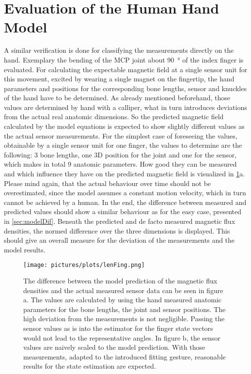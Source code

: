 \FloatBarrier
\section{Evaluation of the Human Hand Model} \label{sec:evalHand}

A similar verification is done for classifying the measurements directly on the hand. Exemplary the bending of the \ac{MCP} joint about \SI{90}{\degree} of the index finger is evaluated. For calculating the expectable magnetic field at a single sensor unit for this movement, excited by wearing a single magnet on the fingertip, the hand parameters and positions for the corresponding bone lengths, sensor and knuckles of the hand have to be determined. As already mentioned beforehand, those values are determined by hand with a calliper, what in turn introduces deviations from the actual real anatomic dimensions. So the predicted magnetic field calculated by the model equations is expected to show slightly different values as the actual sensor measurements. For the simplest case of foreseeing the values, obtainable by a single sensor unit for one finger, the values to determine are the following: 3 bone lengths, one 3D position for the joint and one for the sensor, which makes in total 9 anatomic parameters. How good they can be measured and which influence they have on the predicted magnetic field is visualized in \ref{fig:measHand}a. Please mind again, that the actual behaviour over time should not be overestimated, since the model assumes a constant motion velocity, which in turn cannot be achieved by a human. In the end, the difference between measured and predicted values should show a similar behaviour as for the easy case, presented in \ref{sec:modelDif}. Beneath the predicted and de facto measured magnetic flux densities, the normed difference over the three dimensions is displayed. This should give an overall measure for the deviation of the measurements and the model results.\\
\begin{figure}[!htb]
\centering
\texttt{[image: pictures/plots/lenFing.png]}
\caption[Influence of erroneous hand dimensions on model predictions]
{The difference between the model prediction of the magnetic flux densities and the actual measured sensor data can be seen in figure a. The values are calculated by using the hand measured anatomic parameters for the bone lengths, the joint and sensor positions. The high deviation from the measurements is not negligible. Passing the sensor values as is into the estimator for the finger state vectors would not lead to the representative angles. In figure b, the sensor values are naively scaled to the model prediction. With those measurements, adapted to the introduced fitting gesture, reasonable results for the state estimation are expected.}
\label{fig:measHand}
\end{figure}
